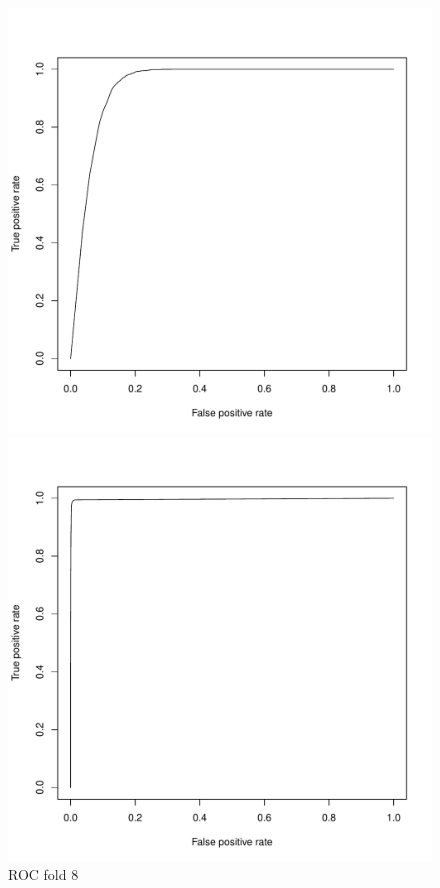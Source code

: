\documentclass{article}\usepackage[]{graphicx}\usepackage[]{color}
\begin{document}
\begin{figure}[h]
  \includegraphics[width=\linewidth]{ROC_block8.pdf}
  \caption{ROC fold 8}\label{}
\endminipage\hfill
{}
  \includegraphics[width=\linewidth]{ROC_block9.pdf}

\end{figure}
\end{document}
